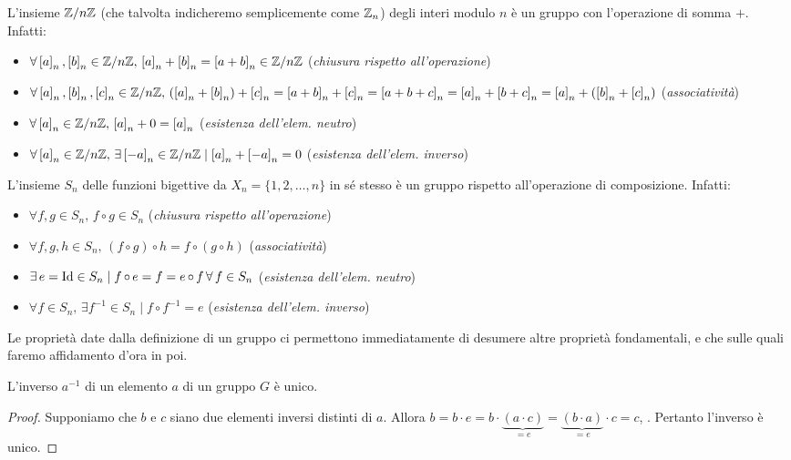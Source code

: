 \begin{example}
    L'insieme $\mathbb Z/n\mathbb Z$ (che talvolta indicheremo semplicemente come $\mathbb Z_n$) degli interi modulo $n$ è un gruppo con l'operazione di
    somma $+$. Infatti:

    \begin{itemize}
        \item $\forall \left[a\right]_n, \left[b\right]_n \in \ZZ/n\ZZ, \, \left[a\right]_n + \left[b\right]_n = \left[a+b\right]_n \in \ZZ/n\ZZ$ (\textit{chiusura rispetto all'operazione})
        \item $\forall \left[a\right]_n, \left[b\right]_n, \left[c\right]_n \in \ZZ/n\ZZ, \, \left(\left[a\right]_n + \left[b\right]_n\right) + \left[c\right]_n = \left[a+b\right]_n +
        \left[c\right]_n = \left[a+b+c\right]_n = \left[a\right]_n + \left[b+c\right]_n = \left[a\right]_n + \left(\left[b\right]_n + \left[c\right]_n\right)$ (\textit{associatività})
        \item $\forall \left[a\right]_n \in \ZZ/n\ZZ, \, \left[a\right]_n + 0 = \left[a\right]_n$ (\textit{esistenza dell'elem. neutro})
        \item $\forall \left[a\right]_n \in \ZZ/n\ZZ, \, \exists \left[-a\right]_n \in \ZZ/n\ZZ \mid \left[a\right]_n + \left[-a\right]_n = 0$ (\textit{esistenza dell'elem. inverso})
    \end{itemize}
\end{example}

\begin{example}
    L'insieme $S_n$ delle funzioni bigettive da $X_n = \{1, 2, \ldots, n\}$ in sé stesso è un
    gruppo rispetto all'operazione di composizione. Infatti:

    \begin{itemize}
        \item $\forall f, g \in S_n, \, f \circ g \in S_n$ (\textit{chiusura rispetto all'operazione})
        \item $\forall f, g, h \in S_n, \, (f \circ g) \circ h = f \circ (g \circ h)$ (\textit{associatività})
        \item $\exists e = \Id \in S_n \mid f \circ e = f = e \circ f \forall f \in S_n$ (\textit{esistenza dell'elem. neutro})
        \item $\forall f \in S_n, \, \exists f^{-1} \in S_n \mid f \circ f^{-1} = e$ (\textit{esistenza dell'elem. inverso})
    \end{itemize}
\end{example}

Le proprietà date dalla definizione di un gruppo ci permettono immediatamente di desumere
altre proprietà fondamentali, e che sulle quali faremo affidamento d'ora in poi.

\begin{theorem}
    L'inverso $a^{-1}$ di un elemento $a$ di un gruppo $G$ è unico.
\end{theorem}

\begin{proof}
    Supponiamo che $b$ e $c$ siano due elementi inversi distinti di $a$. Allora
    $b=b\cdot e=b\cdot \underbrace{(a \cdot c)}_{=e}=\underbrace{(b \cdot a)}_{=e} \cdot c=c$, \Lightning. Pertanto l'inverso è unico.
\end{proof}
